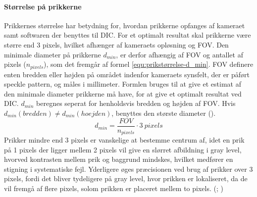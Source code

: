 \paragraph{Størrelse på prikkerne} Prikkernes størrelse har betydning for, hvordan prikkerne opfanges af kameraet samt softwaren der benyttes til DIC. For et optimalt resultat skal prikkerne være større end 3 pixels, hvilket afhænger af kameraets opløsning og FOV. Den minimale diameter på prikkerne {$d_{min}$}, er derfor afhængig af FOV og antallet af pixels ($n_{pixels}$), som det fremgår af formel \ref{equ:prikstørrelse-d_min}. FOV definere enten bredden eller højden på området indenfor kameraets synsfelt, der er påført speckle pattern, og måles i millimeter. Formlen bruges til at give et estimat af den minimale diameter prikkerne må have, for at give et optimalt resultat ved DIC. $d_{min}$ beregnes seperat for henholdsvis bredden og højden af FOV. Hvis $d_{min}(bredden) \neq d_{min}(hoejden)$, benyttes den største diameter (\cite{Reu2014AllAliasing}).
 \begin{equation} \label{equ:prikstørrelse-d_min}
     d_{min} = \frac{FOV}{n_{pixels}} \cdot 3 \ pixels
 \end{equation}
Prikker mindre end 3 pixels er vanskelige at bestemme centrum af, idet en prik på 1 pixels der ligger mellem 2 pixels vil give en slørret afbildning i gray level, hvorved kontrasten mellem prik og baggrund mindskes, hvilket medfører en stigning i systematiske fejl. Yderligere øges præcisionen ved brug af prikker over 3 pixels, fordi det bliver tydeligere på gray level, hvor prikken er lokaliseret, da de vil fremgå af flere pixels, solom prikken er placeret mellem to pixels. (\cite{Reu2014AllAliasing}; \cite{Cui2024EffectError})

